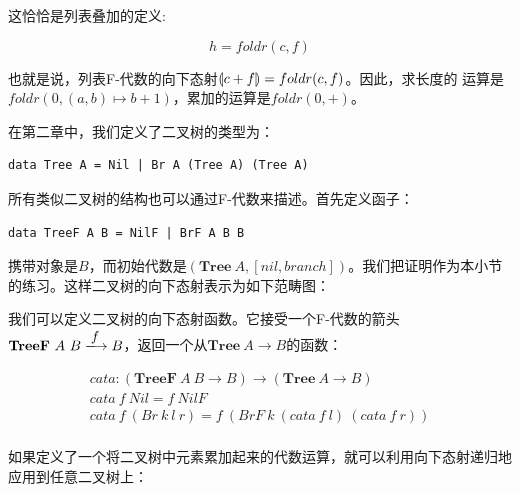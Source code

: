 \documentclass[b5paper]{ctexart}
\begin{document}
\begin{example}
这恰恰是列表叠加的定义:

\[
  h = foldr(c, f)
\]

也就是说，列表F-代数的向下态射$\llparenthesis c + f \rrparenthesis = foldr(c, f)$。因此，求长度的
运算是$foldr(0, (a, b) \mapsto b + 1)$，累加的运算是$foldr(0, +)$。
\end{example}

\begin{example}
在第二章中，我们定义了二叉树的类型为：

\lstset{frame=none}
\begin{lstlisting}
data Tree A = Nil | Br A (Tree A) (Tree A)
\end{lstlisting}

所有类似二叉树的结构也可以通过F-代数来描述。首先定义函子：

\begin{lstlisting}
data TreeF A B = NilF | BrF A B B
\end{lstlisting}

携带对象是$B$，而初始代数是$(\mathbf{Tree}\ A, [nil, branch])$。我们把证明作为本小节的练习。这样二叉树的向下态射表示为如下范畴图：

\begin{center}
\end{center}

我们可以定义二叉树的向下态射函数。它接受一个F-代数的箭头$\mathbf{TreeF}\ A\ B \arrowto{f} B$，返回一个从$\mathbf{Tree}\ A \to B$的函数：

\[
\begin{array}{l}
cata : (\mathbf{TreeF}\ A\ B \to B) \to (\mathbf{Tree}\ A \to B) \\
cata\ f\ Nil = f\ NilF \\
cata\ f\ (Br\ k\ l\ r) =f\ (BrF\ k\ (cata\ f\ l)\ (cata\ f\ r)) \\
\end{array}
\]

如果定义了一个将二叉树中元素累加起来的代数运算，就可以利用向下态射递归地应用到任意二叉树上：


\end{example}
\end{document}
